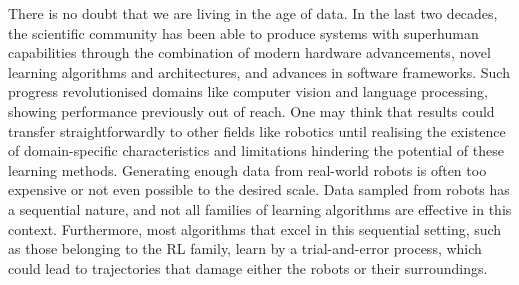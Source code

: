 
{}

\begingroup
\let\clearpage\relax
\let\cleardoublepage\relax
\let\cleardoublepage\relax

\thispagestyle{plain}
\vspace*{-2.2cm}

\begin{center}

    \vspace*{0.2cm}

    {\color{CTtitle}\spacedallcaps{\myTitle}}

    {
    \color{darkgray}
    \vspace*{0.2cm}

    \spacedlowsmallcaps{\myName}
    \vspace*{-3mm}

    \vspace*{-3mm}

    \spacedlowsmallcaps{\myTime}
    }

    \vspace*{0.3cm}
\end{center}


\noindent
There is no doubt that we are living in the age of data.
In the last two decades, the scientific community has been able to produce systems with superhuman capabilities through the combination of modern hardware advancements, novel learning algorithms and architectures, and advances in software frameworks.
Such progress revolutionised domains like computer vision and language processing, showing performance previously out of reach.
One may think that results could transfer straightforwardly to other fields like robotics until realising the existence of domain-specific characteristics and limitations hindering the potential of these learning methods.
Generating enough data from real-world robots is often too expensive or not even possible to the desired scale.
Data sampled from robots has a sequential nature, and not all families of learning algorithms are effective in this context.
Furthermore, most algorithms that excel in this sequential setting, such as those belonging to the \ac{RL} family, learn by a trial-and-error process, which could lead to trajectories that damage either the robots or their surroundings.


